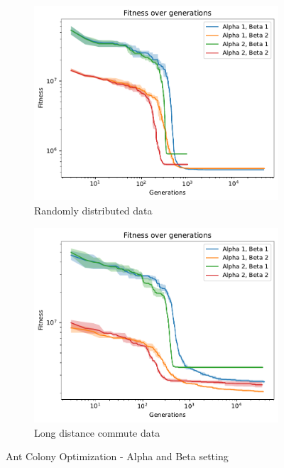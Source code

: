 \begin{figure}
    \centering
    \begin{subfigure}[b]{0.45\textwidth}
        \includegraphics[width=\textwidth]{img/aco_random_ab.pdf}
        \caption{Randomly distributed data}
        \label{fig:aco_ab_random}
    \end{subfigure}
    \begin{subfigure}[b]{0.45\textwidth}
        \includegraphics[width=\textwidth]{img/aco_commute_ab.pdf}
        \caption{Long distance commute data}
        \label{fig:aco_ab_commute}
    \end{subfigure}
    \caption{Ant Colony Optimization - Alpha and Beta setting}
    \label{fig:aco_alpha_beta}
\end{figure}

